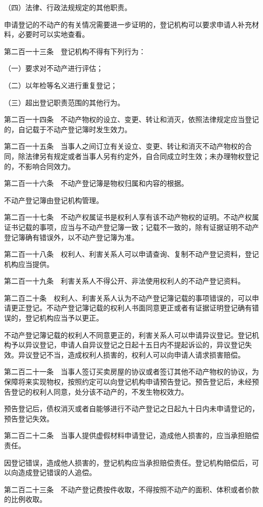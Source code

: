 \documentclass[UTF8,12pt,a4paper]{ctexbook}
\begin{document}
（四）法律、行政法规规定的其他职责。

申请登记的不动产的有关情况需要进一步证明的，登记机构可以要求申请人补充材料，必要时可以实地查看。

第二百一十三条　登记机构不得有下列行为：

（一）要求对不动产进行评估；

（二）以年检等名义进行重复登记；

（三）超出登记职责范围的其他行为。

第二百一十四条　不动产物权的设立、变更、转让和消灭，依照法律规定应当登记的，自记载于不动产登记簿时发生效力。

第二百一十五条　当事人之间订立有关设立、变更、转让和消灭不动产物权的合同，除法律另有规定或者当事人另有约定外，自合同成立时生效；未办理物权登记的，不影响合同效力。

第二百一十六条　不动产登记簿是物权归属和内容的根据。

不动产登记簿由登记机构管理。

第二百一十七条　不动产权属证书是权利人享有该不动产物权的证明。不动产权属证书记载的事项，应当与不动产登记簿一致；记载不一致的，除有证据证明不动产登记簿确有错误外，以不动产登记簿为准。

第二百一十八条　权利人、利害关系人可以申请查询、复制不动产登记资料，登记机构应当提供。

第二百一十九条　利害关系人不得公开、非法使用权利人的不动产登记资料。

第二百二十条　权利人、利害关系人认为不动产登记簿记载的事项错误的，可以申请更正登记。不动产登记簿记载的权利人书面同意更正或者有证据证明登记确有错误的，登记机构应当予以更正。

不动产登记簿记载的权利人不同意更正的，利害关系人可以申请异议登记。登记机构予以异议登记，申请人自异议登记之日起十五日内不提起诉讼的，异议登记失效。异议登记不当，造成权利人损害的，权利人可以向申请人请求损害赔偿。

第二百二十一条　当事人签订买卖房屋的协议或者签订其他不动产物权的协议，为保障将来实现物权，按照约定可以向登记机构申请预告登记。预告登记后，未经预告登记的权利人同意，处分该不动产的，不发生物权效力。

预告登记后，债权消灭或者自能够进行不动产登记之日起九十日内未申请登记的，预告登记失效。

第二百二十二条　当事人提供虚假材料申请登记，造成他人损害的，应当承担赔偿责任。

因登记错误，造成他人损害的，登记机构应当承担赔偿责任。登记机构赔偿后，可以向造成登记错误的人追偿。

第二百二十三条　不动产登记费按件收取，不得按照不动产的面积、体积或者价款的比例收取。
\end{document}

